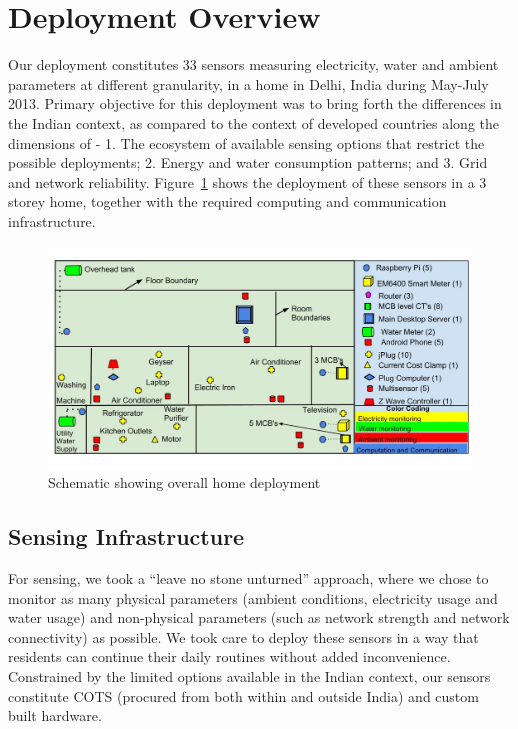 \documentclass[10pt]{sensys-proc}
\newcommand{\figref}[1]{Figure~\ref{#1}}
\begin{document}
\vspace{-1mm}
\section{Deployment Overview}
Our deployment constitutes 33 sensors measuring electricity, water and ambient parameters at different granularity, in a home in Delhi, India during May-July 2013. Primary objective for this deployment was to bring forth the differences in the Indian context, as compared to the context of developed countries along the dimensions of - 1. The ecosystem of available sensing options that restrict the possible deployments; 2. Energy and water consumption patterns; and 3. Grid and network reliability. \figref{fig:overall} shows the deployment of these sensors in a 3 storey home, together with the required computing and communication infrastructure. %

\begin{figure} 
	\vspace{-5mm}    
    \includegraphics[scale=0.19]{./figures/overall_deployment.jpg}
    \vspace{-10mm}    
    \caption{Schematic showing overall home deployment} 
    \vspace{-2mm}  
    \label{fig:overall}
\end{figure}

\subsection{Sensing Infrastructure}
\label{sec:sensing}
For sensing, we took a ``leave no stone unturned'' approach, where  we chose to monitor as many physical parameters (ambient conditions, electricity usage and water usage) and non-physical parameters (such as network strength and network connectivity) as possible. We took care to deploy these sensors in a way that residents can continue their daily routines without added inconvenience. Constrained by the limited options available in the Indian context, our sensors constitute COTS (procured from both within and outside India) and custom built hardware. %
\end{document}
